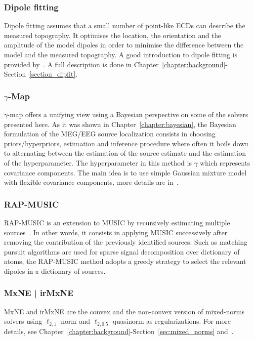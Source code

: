 \subsubsection{Dipole fitting}
Dipole fitting assumes that a small number of point-like \ac{ECD}s can describe the measured topography. It optimises the location, the orientation and the amplitude of the model dipoles in order to minimise the difference between the model and the measured topography. A good introduction to dipole fitting is provided by~\cite{scherg1990fundamentals}. A full description is done in Chapter~\ref{chapter:background}-Section~\ref{section_dipfit}.

\subsubsection{$\gamma$-Map}
$\gamma$-map offers a unifying view using a Bayesian perspective on some of the solvers presented here. As it was shown in Chapter~\ref{chapter:bayesian}, the Bayesian formulation of the MEG/EEG source localization consists in choosing priors/hyperpriors, estimation and inference procedure where often it boils down to alternating between the estimation of the source estimate and the estimation of the hyperparameter. The hyperparameter in this method is $\gamma$ which represents covariance components. The main idea is to use simple Gaussian mixture model with flexible covariance components, more details are in~\cite{Wipf-Nagarajan:2009}.

\subsubsection{RAP-MUSIC}
\Ac{RAP-MUSIC} is an extension to \ac{MUSIC} by recursively estimating multiple sources~\cite{mosher1997source,mosher1999source}. In other words, it consists in applying MUSIC successively after removing the contribution of the previously identified sources. Such as matching pursuit algorithms are used for sparse signal decomposition over dictionary of atoms, the RAP-MUSIC method adopts a greedy strategy to select the relevant dipoles in a dictionary of sources.

\subsubsection{MxNE | irMxNE}
\Ac{MxNE} and \ac{irMxNE} are the convex and the non-convex version of mixed-norms solvers using $\ell_{2,1}$-norm and $\ell_{2,0.5}$-quasinorm as regularizations. For more details, see Chapter~\ref{chapter:background}-Section~\ref{sec:mixed_norms} and~\cite{gramfort2012mixed,strohmeier-etal:16}.

